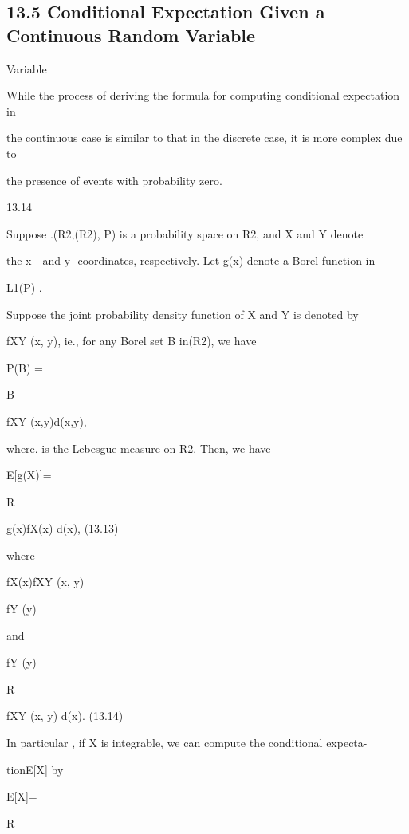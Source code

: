 \subsection*{13.5 Conditional Expectation Given a Continuous Random Variable}

Variable

While the process of deriving the formula for computing conditional expectation in

the continuous case is similar to that in the discrete case, it is more complex due to

the presence of events with probability zero.

\begin{thmbox}{13.14}
\end{thmbox}

Suppose .(R2,(R2), P) is a probability space on R2, and X and Y denote

the x - and y -coordinates, respectively. Let g(x) denote a Borel function in

L1(P) .

Suppose the joint probability density function of X and Y is denoted by

fXY (x, y), ie., for any Borel set B in(R2), we have

P(B) =

\int

B

fXY (x,y)d\lambda(x,y),

where. \lambda is the Lebesgue measure on R2. Then, we have

E[g(X)\vertY]=

\int

R

g(x)fX\vertY (x\verty) d\lambda(x), (13.13)

where

fX\vertY (x\verty)\coloneqq fXY (x, y)

fY (y)

and

fY (y)\coloneqq

\int

R

fXY (x, y) d\lambda(x). (13.14)

In particular , if X is integrable, we can compute the conditional expecta-

tionE[X\vertY] by

E[X\vertY]=

\int

R

